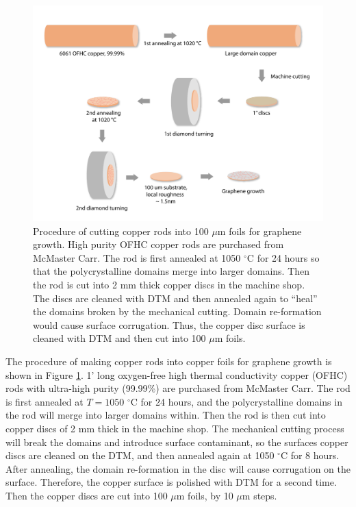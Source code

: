 \documentclass[pdflatex, sectionletters, 12pt]{pittetd}    %
\begin{document}
\begin{figure}[p]
	\centering
	\includegraphics[width=1\textwidth]{Drawing/CopperProcessing.pdf}
	\caption{Procedure of cutting copper rods into 100 $\mu$m foils for graphene growth. High purity OFHC copper rods are purchased from McMaster Carr. The rod is first annealed at 1050 $^{\circ}$C for 24 hours so that the polycrystalline domains merge into larger domains. Then the rod is cut into 2 mm thick copper discs in the machine shop. The discs are cleaned with DTM and then annealed again to ``heal'' the domains broken by the mechanical cutting. Domain re-formation would cause surface corrugation. Thus, the copper disc surface is cleaned with DTM and then cut into 100 $\mu$m foils.}
	\label{FIG:CopperProcessing}
\end{figure}

The procedure of making copper rods into copper foils for graphene growth is shown in Figure \ref{FIG:CopperProcessing}. 1' long oxygen-free high thermal conductivity copper (OFHC) rods with ultra-high purity (99.99\%) are purchased from McMaster Carr. The rod is first annealed at $T=1050$ $^{\circ}$C for 24 hours, and the polycrystalline domains in the rod will merge into larger domains within. Then the rod is then cut into copper discs of 2 mm thick in the machine shop. The mechanical cutting process will break the domains and introduce surface contaminant, so the surfaces copper discs are cleaned on the DTM, and then annealed again at 1050 $^{\circ}$C for 8 hours. After annealing, the domain re-formation in the disc will cause corrugation on the surface. Therefore, the copper surface is polished with DTM for a second time. Then the copper discs are cut into 100 $\mu$m foils, by 10 $\mu$m steps.
\end{document}
